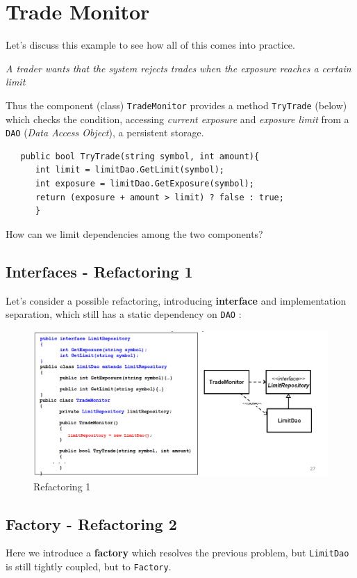 \section{Trade Monitor}
Let's discuss this  example to see how all of this comes into practice.
\begin{center}
   \textit{A trader wants that the system rejects trades when the exposure reaches a certain limit}
\end{center}

Thus the component (class) \texttt{TradeMonitor} provides
a method \texttt{TryTrade} (below) which checks the condition,
accessing \textit{current exposure} and \textit{exposure limit} from a \texttt{DAO} (\textit{Data Access Object}), a persistent storage.
\begin{lstlisting}
   public bool TryTrade(string symbol, int amount){
      int limit = limitDao.GetLimit(symbol);
      int exposure = limitDao.GetExposure(symbol);
      return (exposure + amount > limit) ? false : true;
      }
\end{lstlisting}
How can we limit dependencies among the two components?
\subsection{Interfaces - Refactoring 1}
Let's consider a possible refactoring, introducing \textbf{interface} and implementation separation,
which still has a static dependency on \texttt{DAO} :
\begin{figure}[htbp]
   \centering
   \includegraphics{images/trademonitor_ref1.png}
   \caption{Refactoring 1}
   \label{fig:trademonitor_ref1}
\end{figure}

\subsection{Factory - Refactoring 2}
Here we introduce a \textbf{factory} which resolves the previous problem, but \texttt{LimitDao} is still tightly coupled, but to \texttt{Factory}.

